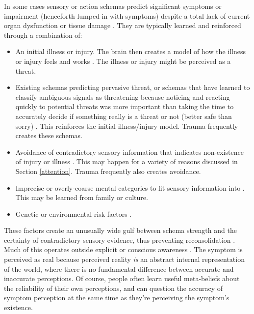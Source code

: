 \documentclass[12pt,letterpaper]{book}
\begin{document}
In some cases sensory or action schemas predict significant symptoms or impairment (henceforth lumped in with symptoms) despite a total lack of current organ dysfunction or tissue damage \cite{berghPsychogenic}. They are typically learned and reinforced through a combination of:
\begin{itemize}
    \item An initial illness or injury. The brain then creates a model of how the illness or injury feels and works \cite{berghPsychogenic}. The illness or injury might be perceived as a threat.
    \item Existing schemas predicting pervasive threat, or schemas that have learned to classify ambiguous signals as threatening because noticing and reacting quickly to potential threats was more important than taking the time to accurately decide if something really is a threat or not (better safe than sorry) \cite{berghSelfEvidencing}. This reinforces the initial illness/injury model. Trauma frequently creates these schemas.
    \item Avoidance of contradictory sensory information that indicates non-existence of injury or illness \cite{berghSelfEvidencing}. This may happen for a variety of reasons discussed in Section \ref{attention}. Trauma frequently also creates avoidance.
    \item Imprecise or overly-coarse mental categories to fit sensory information into \cite{berghPsychogenic}. This may be learned from family or culture.
    \item Genetic or environmental risk factors \cite{berghPsychogenic}.
\end{itemize}
These factors create an unusually wide gulf between schema strength and the certainty of contradictory sensory evidence, thus preventing reconsolidation \cite{berghPsychogenic}. Much of this operates outside explicit or conscious awareness \cite{clark2015surfing}. The symptom is perceived as real because perceived reality \textit{is} an abstract internal representation of the world, where there is no fundamental difference between accurate and inaccurate perceptions. Of course, people often learn useful meta-beliefs about the reliability of their own perceptions, and can question the accuracy of symptom perception at the same time as they're perceiving the symptom's existence.
\end{document}

